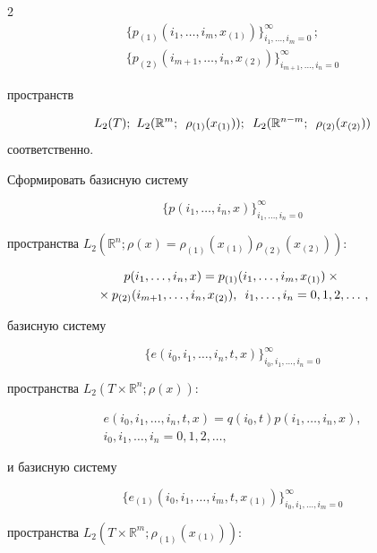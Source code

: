 \begin{multicols}{2}
\begin{gather*}
{\{p_{(1)}(i_1,\dots,i_m,x_{(1)})\}_{i_1,\dots,i_m = 0}^\infty}\,;\\


{\{p_{(2)}(i_{m+1},\dots,i_n,x_{(2)})\}_{i_{m+1},\dots,i_n = 0}^\infty}


\end{gather*} 


пространств 


$$


L_2(T);\ L_2(\mathbb{R}^m;\enskip \rho_{(1)}(x_{(1)}));\enskip 


L_2(\mathbb{R}^{n-m};\enskip \rho_{(2)}(x_{(2)}))


$$ соответственно. 


Сформировать базисную систему 


$$


{\{p(i_1,\dots,i_n,x)\}_{i_1,\dots,i_n = 0}^\infty}


$$


пространства ${L_2(\mathbb{R}^n; \rho(x) = \rho_{(1)}(x_{(1)}) \rho_{(2)}(x_{(2)}))}$:


\begin{multline*}


  p(i_1,\dots,i_n,x) = p_{(1)}(i_1,\dots,i_m,x_{(1)}) \times{}\\


  {}\times p_{(2)}(i_{m+1},\dots,i_n,x_{(2)}),\enskip i_1,\dots,i_n = 0,1,2,\dots\,,


\end{multline*}


базисную систему 


$${\{e(i_0,i_1,\dots,i_n,t,x)\}_{i_0,i_1,\dots,i_n = 0}^\infty}


$$ 


пространства ${L_2(T \times \mathbb{R}^n; \rho(x))}$:


\begin{multline*}


  e(i_0,i_1,\dots,i_n,t,x) = q(i_0,t)  p(i_1,\dots,i_n,x),\\


   i_0,i_1,\dots,i_n = 0,1,2,\dots,


\end{multline*}


и базисную систему 


$$


{\{e_{(1)}(i_0,i_1,\dots,i_m,t,x_{(1)})\}_{i_0,i_1,\dots,i_m = 0}^\infty}


$$ 


пространства ${L_2(T \times \mathbb{R}^m; \rho_{(1)}(x_{(1)}))}$:



\end{multicols}
